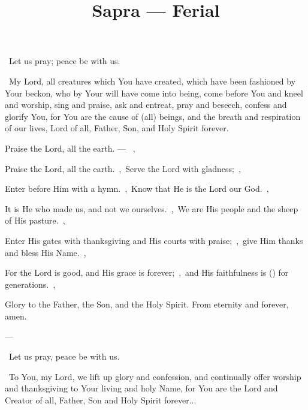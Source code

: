 \documentclass[12pt,twoside,a5paper]{article}
\begin{document}
\title{Sapra --- Ferial}
\author{}
\date{}
\maketitle


\dd~Let us pray; peace be with us.

\cc~My Lord, all creatures which You have created, which have been fashioned by Your beckon, who by Your will have come into being, come before You and kneel and worship, sing and praise, ask and entreat, pray and beseech, confess and glorify You, for You are the cause of (all) beings, and the breath and respiration of our lives, Lord of all, Father, Son, and Holy Spirit forever.



\begin{halfparskip}
   Praise the Lord, all the earth. --- ~\sep

  Praise the Lord, all the earth.~\sep\ Serve the Lord with gladness;~\sep

  Enter before Him with a hymn.~\sep\ Know that He is the Lord our God.~\sep

  It is He who made us, and not we ourselves.~\sep\ We are His people and the sheep of His pasture.~\sep

  Enter His gates with thanksgiving and His courts with praise;~\sep\ give Him thanks and bless His Name.~\sep

  For the Lord is good, and His grace is forever;~\sep\ and His faithfulness is () for generations.~\sep

  Glory to the Father, the Son, and the Holy Spirit. From eternity and forever, amen.

   --- 
\end{halfparskip}

\dd~Let us pray, peace be with us.

\cc~To You, my Lord, we lift up glory and confession, and continually offer worship and thanksgiving to Your living and holy Name, for You are the Lord and Creator of all, Father, Son and Holy Spirit forever...
\end{document}
